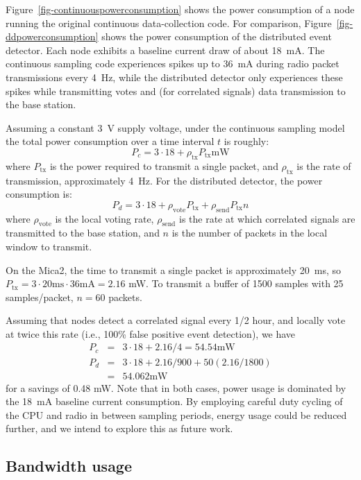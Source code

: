 Figure~\ref{fig-continuouspowerconsumption} shows the power consumption 
of a node running the original continuous data-collection code.
For comparison, Figure~\ref{fig-ddpowerconsumption} shows the power
consumption of the distributed event detector. Each node exhibits
a baseline current draw of about 18~mA. The continuous sampling code
experiences spikes up to 36~mA during radio packet transmissions
every 4~Hz, while the distributed detector only experiences these
spikes while transmitting votes and (for correlated signals) data
transmission to the base station. 

Assuming a constant 3~V supply voltage, under the continuous sampling model 
the total power consumption over a time interval $t$ is roughly:
\[
   P_c = 3 \cdot 18 + \rho_\mathrm{tx} P_\mathrm{tx}  \mathrm{mW}
\]
where $P_\mathrm{tx}$ is the power required to transmit a single
packet, and $\rho_\mathrm{tx}$ is the rate of transmission, 
approximately 4~Hz.
For the distributed detector, the power consumption is:
\[
   P_d = 3 \cdot 18 + \rho_\mathrm{vote} P_\mathrm{tx} +
     \rho_\mathrm{send} P_\mathrm{tx} n
\]
where $\rho_\mathrm{vote}$ is the local voting rate,
$\rho_\mathrm{send}$ is the rate at which correlated signals are
transmitted to the base station, and $n$ is the number of packets in the
local window to transmit. 

On the Mica2, the time to transmit a single packet is approximately
20~ms, so $P_\mathrm{tx} = 3 \cdot 20 \mathrm{ms} \cdot 36 \mathrm{mA} =
2.16$ mW. To transmit a buffer of 1500 samples with 25 samples/packet,
$n = 60$ packets.

Assuming that nodes detect a correlated signal every 1/2 hour, 
and locally vote at twice this rate (i.e., 100\% false positive event
detection), we have
\begin{eqnarray*}
  P_c &=& 3 \cdot 18 + 2.16 / 4 = 54.54 \mathrm{mW} \\
  P_d &=& 3 \cdot 18 + 2.16 / 900 + 50 (2.16 / 1800) \\
      &=& 54.062 \mathrm{mW}
\end{eqnarray*}
for a savings of 0.48 mW. Note that in both cases, power usage is 
dominated by the 18~mA baseline current consumption. By employing careful 
duty cycling of the CPU and radio in between sampling periods, energy usage
could be reduced further, and we intend to explore this as future work.

\subsection{Bandwidth usage}

